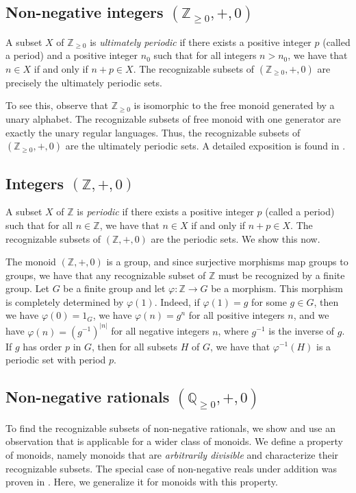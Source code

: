\documentclass{llncs}
\begin{document}
\subsection{Non-negative integers $(\mathbb{Z}_{\ge 0}, +, 0)$}
A subset $X$ of $\mathbb{Z}_{\ge 0}$ is \emph{ultimately periodic} if there exists a positive integer $p$ (called a period) and  a positive integer $n_0$ such that for all integers $n > n_0$, we have that $n \in X$ if and only if $n + p \in X$. 
The recognizable subsets of \((\mathbb{Z}_{\ge 0}, +, 0)\) are precisely the ultimately periodic sets.

To see this, observe that \(\mathbb{Z}_{\ge 0}\) is isomorphic to the free monoid generated by a unary alphabet.
The recognizable subsets of free monoid with one generator are exactly the unary regular languages.
Thus, the recognizable subsets of $(\mathbb{Z}_{\ge 0}, +, 0)$ are the ultimately periodic sets. 
A detailed exposition is found in \cite{eilenberg1974automata}.

\subsection{Integers $(\mathbb{Z}, +, 0)$}
A subset $X$ of $\mathbb{Z}$ is \emph{periodic} if there exists a positive integer $p$ (called a period) such that for all $n \in \mathbb{Z}$, we have that $n \in X$ if and only if $n + p \in X$. 
The recognizable subsets of $(\mathbb{Z}, +, 0)$ are the periodic sets. 
We show this now.

The monoid $(\mathbb{Z}, +, 0)$ is a group, and since surjective morphisms map groups to groups, we have that any recognizable subset of \(\mathbb{Z}\) must be recognized by a finite group.
Let $G$ be a finite group and let $\varphi \colon \mathbb{Z} \to G$ be a morphism. 
This morphism is completely determined by $\varphi(1)$. 
Indeed, if $\varphi(1) = g$ for some $g \in G$, then 
we have $\varphi(0) = 1_G$, 
we have $\varphi(n) = g^n$ for all positive integers $n$, 
and we have $\varphi(n) = (g^{-1})^{|n|}$ for all negative integers $n$, where $g^{-1}$ is the inverse of $g$.
If $g$ has order $p$ in $G$, then for all subsets $H$ of $G$, we have that $\varphi^{-1}(H)$ is a periodic set with period $p$.

\subsection{Non-negative rationals $(\mathbb{Q}_{\geq 0}, +, 0)$}

To find the recognizable subsets of non-negative rationals, we show and use an observation that is applicable for a wider class of monoids.
We define a property of monoids, namely monoids that are \emph{arbitrarily divisible} and characterize their recognizable subsets. 
The special case of non-negative reals under addition was proven in \cite{dima2001algebraic}. 
Here, we generalize it for monoids with this property.
\end{document}
